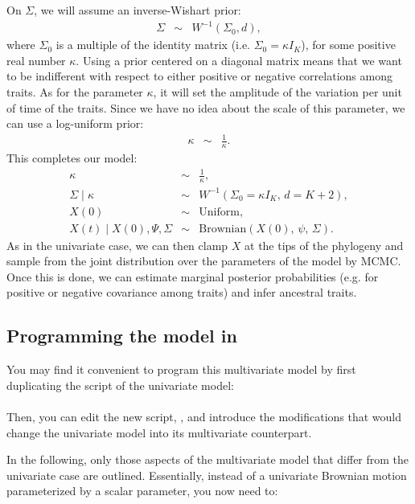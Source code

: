 On $\Sigma$, we will assume an inverse-Wishart prior:
\begin{eqnarray*}
\Sigma &\sim& W^{-1}(\Sigma_0, d),
\end{eqnarray*}
where $\Sigma_0$ is a multiple of the identity matrix (i.e. $\Sigma_0 = \kappa I_K$), for some positive real number $\kappa$.
Using a prior centered on a diagonal matrix means that we want to be indifferent with respect to either positive or negative correlations among traits. As for the parameter $\kappa$, it will set the amplitude of the variation per unit of time of the traits. Since we have no idea about the scale of this parameter, we can use a log-uniform prior:
\begin{eqnarray*}
\kappa &\sim& \frac{1}{\kappa}.
\end{eqnarray*}
This completes our model:
\begin{eqnarray*}
\kappa &\sim& \frac{1}{\kappa},
\\
\Sigma \mid \kappa &\sim& W^{-1}(\Sigma_0 = \kappa I_K , \, d = K+2),
\\
X(0) &\sim& \text{Uniform},
\\
X(t) \mid X(0), \Psi, \Sigma &\sim& \text{Brownian}(X(0), \, \psi, \, \Sigma).
\end{eqnarray*}
As in the univariate case, we can then clamp $X$ at the tips of the phylogeny and sample from the joint distribution over the parameters of the model by MCMC.
Once this is done, we can estimate marginal posterior probabilities (e.g. for positive or negative covariance among traits) and infer ancestral traits.

\subsection*{Programming the model in \RevBayes}

You may find it convenient to program this multivariate model by first duplicating the script of the univariate model:
\\
\\
Then, you can edit the new script, , and introduce the modifications that would change the univariate model
into its multivariate counterpart.

In the following, only those aspects of the multivariate model that differ from the univariate case are outlined.
Essentially, instead of a univariate Brownian motion parameterized by a scalar parameter, you now need to:

